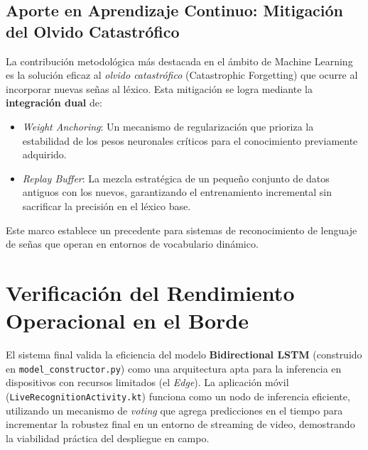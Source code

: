 \subsection{Aporte en Aprendizaje Continuo: Mitigación del Olvido Catastrófico}
\par La contribución metodológica más destacada en el ámbito de Machine Learning es la solución eficaz al \textit{olvido catastrófico} (Catastrophic Forgetting) que ocurre al incorporar nuevas señas al léxico. Esta mitigación se logra mediante la \textbf{integración dual} de:
\begin{itemize}
    \item \textit{Weight Anchoring}: Un mecanismo de regularización que prioriza la estabilidad de los pesos neuronales críticos para el conocimiento previamente adquirido.
    \item \textit{Replay Buffer}: La mezcla estratégica de un pequeño conjunto de datos antiguos con los nuevos, garantizando el entrenamiento incremental sin sacrificar la precisión en el léxico base.
\end{itemize}
Este marco establece un precedente para sistemas de reconocimiento de lenguaje de señas que operan en entornos de vocabulario dinámico.

\section{Verificación del Rendimiento Operacional en el Borde}
\par El sistema final valida la eficiencia del modelo \textbf{Bidirectional LSTM} (construido en \lstinline|model_constructor.py|) como una arquitectura apta para la inferencia en dispositivos con recursos limitados (el \textit{Edge}). La aplicación móvil (\lstinline|LiveRecognitionActivity.kt|) funciona como un nodo de inferencia eficiente, utilizando un mecanismo de \textit{voting} que agrega predicciones en el tiempo para incrementar la robustez final en un entorno de streaming de video, demostrando la viabilidad práctica del despliegue en campo.

